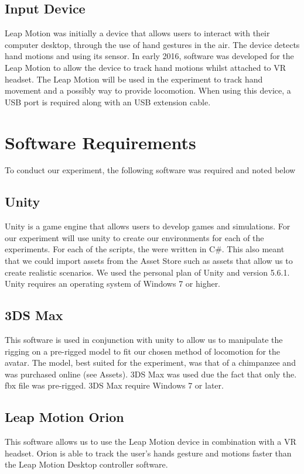 \documentclass[12pt]{report}
\begin{document}
\subsection{Input Device}

Leap Motion was initially a device that allows users to interact with their computer desktop, through the use of hand gestures in the air. The device detects hand motions and using its sensor. In early 2016, software was developed for the Leap Motion to allow the device to track hand motions whilst attached to VR headset. The Leap Motion will be used in the experiment to track hand movement and a possibly way to provide locomotion. When using this device, a USB port is required along with an USB extension cable. 

\section{Software Requirements}
To conduct our experiment, the following software was required and noted below

\subsection{Unity}
Unity is a game engine that allows users to develop games and simulations. For our experiment will use unity to create our environments for each of the experiments. For each of the scripts, the were written in C\#. This also meant that we could import assets from the Asset Store such as assets that allow us to create realistic scenarios. We used the personal plan of Unity and version 5.6.1. Unity requires an operating system of Windows 7 or higher.

\subsection{3DS Max}
This software is used in conjunction with unity to allow us to manipulate the rigging on a pre-rigged model to fit our chosen method of locomotion for the avatar. The model, best suited for the experiment, was that of a chimpanzee and was purchased online (see Assets). 3DS Max was used due the fact that only the. fbx file was pre-rigged. 3DS Max require Windows 7 or later.

\subsection{Leap Motion Orion}
This software allows us to use the Leap Motion device in combination with a VR headset. Orion is able to track the user’s hands gesture and motions faster than the Leap Motion Desktop controller software.  
\end{document}
